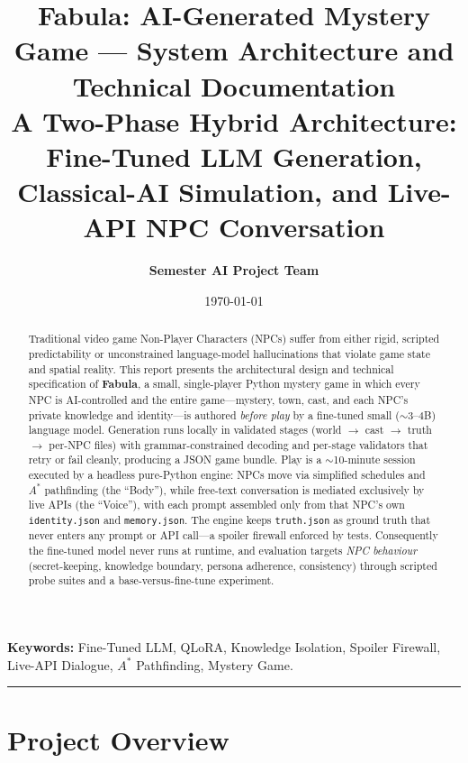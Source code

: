 \documentclass[11pt,a4paper]{article}
\title{\textbf{Fabula: AI-Generated Mystery Game --- System Architecture and Technical Documentation}\\[0.5em]
\large A Two-Phase Hybrid Architecture: Fine-Tuned LLM Generation, Classical-AI Simulation, and Live-API NPC Conversation}
\author{\textbf{Semester AI Project Team}}
\date{\today}
\begin{document}
\maketitle

\begin{abstract}
Traditional video game Non-Player Characters (NPCs) suffer from either rigid, scripted predictability or unconstrained language-model hallucinations that violate game state and spatial reality. This report presents the architectural design and technical specification of \textbf{Fabula}, a small, single-player Python mystery game in which every NPC is AI-controlled and the entire game---mystery, town, cast, and each NPC's private knowledge and identity---is authored \emph{before play} by a fine-tuned small ($\sim$3--4B) language model. Generation runs locally in validated stages (world $\rightarrow$ cast $\rightarrow$ truth $\rightarrow$ per-NPC files) with grammar-constrained decoding and per-stage validators that retry or fail cleanly, producing a JSON game bundle. Play is a $\sim$10-minute session executed by a headless pure-Python engine: NPCs move via simplified schedules and $A^*$ pathfinding (the ``Body''), while free-text conversation is mediated exclusively by live APIs (the ``Voice''), with each prompt assembled only from that NPC's own \texttt{identity.json} and \texttt{memory.json}. The engine keeps \texttt{truth.json} as ground truth that never enters any prompt or API call---a spoiler firewall enforced by tests. Consequently the fine-tuned model never runs at runtime, and evaluation targets \emph{NPC behaviour} (secret-keeping, knowledge boundary, persona adherence, consistency) through scripted probe suites and a base-versus-fine-tune experiment.
\end{abstract}

\vspace{1em}
\noindent\textbf{Keywords:} Fine-Tuned LLM, QLoRA, Knowledge Isolation, Spoiler Firewall, Live-API Dialogue, $A^*$ Pathfinding, Mystery Game.

\vspace{1.5em}
\hrule
\vspace{1.5em}

\tableofcontents
\newpage

\section{Project Overview}
\end{document}

